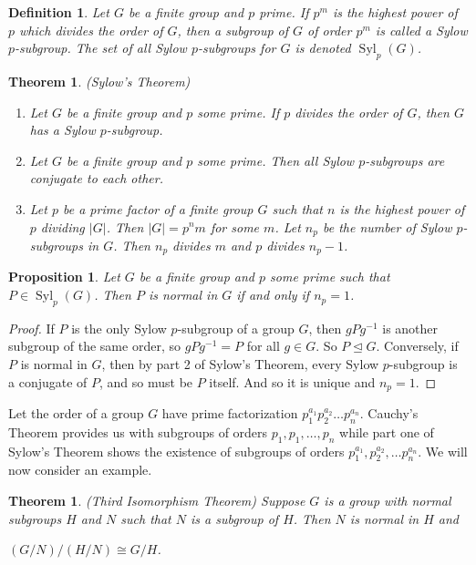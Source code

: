 \documentclass[12pt]{report}
\theoremstyle{newthm}
\newtheorem{Proposition}[lem]{Proposition}
\newtheorem{Theorem}[lem]{Theorem}
\newtheorem{Definition}[lem]{Definition}
\DeclareMathOperator{\Syl}{Syl}
\begin{document}
\begin{Definition} Let $G$ be a finite group and $p$ prime. If $p^m$ is the highest power of $p$ which divides the order of $G$, then a subgroup of $G$ of order $p^m$ is called a \textit{Sylow $p$-subgroup}. The set of all Sylow $p$-subgroups for $G$ is denoted $\Syl_p(G)$.
\end{Definition}

\begin{Theorem}(Sylow's Theorem)\\
{\singlespacing
\begin{enumerate}[nosep]
    \item Let $G$ be a finite group and $p$ some prime. If $p$ divides the order of $G$, then $G$ has a Sylow $p$-subgroup.
    \item Let $G$ be a finite group and $p$ some prime. Then all Sylow $p$-subgroups are conjugate to each other.
    \item Let $p$ be a prime factor of a finite group $G$ such that $n$ is the highest power of $p$ dividing $|G|$. Then $|G|=p^nm$ for some $m$. Let $n_p$ be the number of Sylow $p$-subgroups in $G$. Then $n_p$ divides $m$ and $p$ divides $n_p-1$.
\end{enumerate}
}
\end{Theorem}

\begin{Proposition}\label{normal sylow}
Let $G$ be a finite group and $p$ some prime such that $P\in \Syl_p(G)$. Then $P$ is normal in $G$ if and only if $n_p=1$.
\end{Proposition}

\begin{proof}
If $P$ is the only Sylow $p$-subgroup of a group $G$, then $gPg^{-1}$ is another subgroup of the same order, so $gPg^{-1}=P$ for all $g\in G$. So $P\trianglelefteq G$. Conversely, if $P$ is normal in $G$, then by part 2 of Sylow's Theorem, every Sylow $p$-subgroup is a conjugate of $P$, and so must be $P$ itself. And so it is unique and $n_p=1$.
\end{proof}

Let the order of a group $G$ have prime factorization $p_1^{a_1}p_2^{a_2}\dots p_n^{a_n}$. Cauchy's Theorem provides us with subgroups of orders $p_1, p_1, \dotsc , p_n$ while part one of Sylow's Theorem shows the existence of subgroups of orders $p_1^{a_1}, p_2^{a_2},\dotsc p_n^{a_n}$. We will now consider an example.


\begin{Theorem}(Third Isomorphism Theorem)
Suppose $G$ is a group with normal subgroups $H$ and $N$ such that $N$ is a subgroup of $H$. Then $N$ is normal in $H$ and \begin{center}{$(G/N)/(H/N)\cong G/H$}. \end{center}
\end{Theorem}
\end{document}
